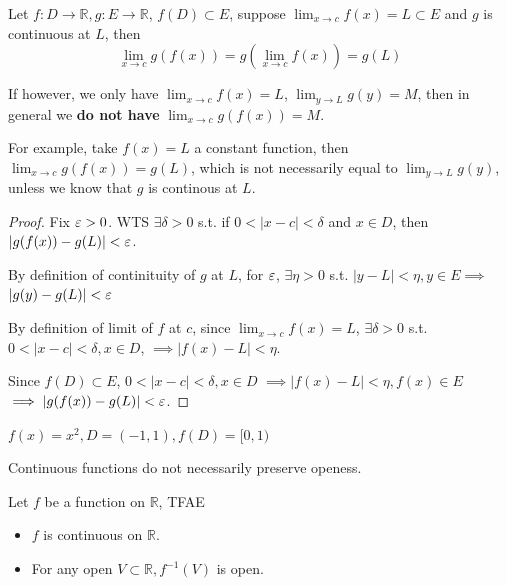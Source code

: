 \begin{theorem}
    \hfill

    Let $f: D \to \mathbb{R}, g: E \to \mathbb{R}$,
    $f(D) \subset E$, 
    suppose $\lim_{x \to c}f(x) = L \subset E$ and 
    $g$ is continuous at $L$,
    then 
    \[
        \lim_{x \to c} g(f(x)) = 
        g \left( \lim_{x \to c} f(x)\right)  = 
        g(L)
    \]
\end{theorem}

\begin{example}
    If however, we only have 
    $\lim_{x \to c} f(x) = L$,
    $\lim_{y \to L} g(y) = M$,
    then in general we \textbf{do not have}
    $\lim_{x \to c} g(f(x)) = M$.
    \medskip

    For example, take $f(x) = L$  a constant function, 
    then $\lim_{x \to c}g(f(x))= g(L)$,
    which is not necessarily equal to 
    $\lim_{y \to L}g(y)$, unless we know
    that $g$ is continous at $L$.
\end{example}

\begin{proof}
    Fix $\varepsilon >0$. WTS $\exists \delta > 0$ s.t. 
    if 
    $0 < |x - c | < \delta $ and $x \in D$, 
    then $|g(f(x)) - g(L) | < \varepsilon$. 
    \medskip

    By definition of continituity of $g$ at $L$,
    for $\varepsilon$, $\exists \eta > 0$ s.t. 
    $|y - L | < \eta, y \in E \implies $
    $|g(y) - g(L) | < \varepsilon$
    \medskip

    By definition of limit of $f$ at $c$,
    since $\lim_{x \to c}f(x) = L$,
    $\exists \delta > 0$ s.t. 
    $0 < | x - c | < \delta, x \in D$, 
    $\implies |f(x) - L | < \eta$.
    \medskip

    Since $f(D) \subset E$, 
    $0 < | x - c | < \delta, x \in D$
    $\implies |f(x) - L | < \eta, f(x) \in E$
    $\implies |g(f(x)) - g(L) | < \varepsilon$.
\end{proof}

\begin{example}
    $f(x) = x^2, D = (-1, 1), f(D) = [0, 1)$
\end{example}

\begin{remark}
    Continuous functions do not necessarily preserve
    openess.
\end{remark}

\begin{theorem}
Let $f$ be a function on $\mathbb{R}$, TFAE
\begin{itemize}
    \item $f$ is continuous on $\mathbb{R}$.
    \item For any open $V \subset \mathbb{R}, f^{-1}(V)$ is open.
\end{itemize} 
\end{theorem}

